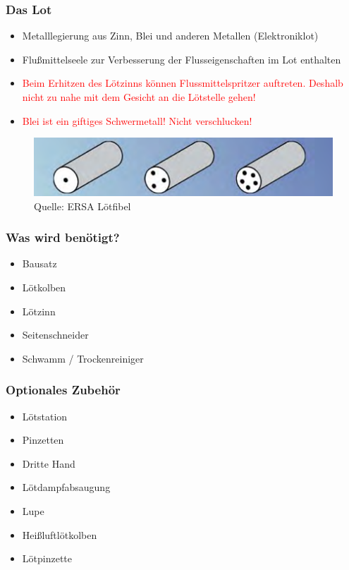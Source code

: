 \documentclass[10pt]{beamer}
\begin{document}
	\begin{frame}
	\frametitle{Das Lot}
	\begin{itemize}
		\item{Metalllegierung aus Zinn, Blei und anderen Metallen (Elektroniklot)}
		\item{Flußmittelseele zur Verbesserung der Flusseigenschaften im Lot enthalten}
		\item{\textcolor{red}{Beim Erhitzen des Lötzinns können Flussmittelspritzer auftreten. Deshalb nicht zu nahe mit dem Gesicht an die Lötstelle gehen!}}
		\item{\textcolor{red}{Blei ist ein giftiges Schwermetall! Nicht verschlucken!}}
	\end{itemize}
	\begin{figure}[hbtp]
		\centering
		\includegraphics[width=\linewidth]{images/lotseele.png}
		\caption{Quelle: ERSA Lötfibel}
	\end{figure}
	\end{frame}

	\begin{frame}
	\frametitle{Was wird benötigt?}
	\begin{itemize}
		\item{Bausatz}
		\item{Lötkolben}
		\item{Lötzinn}
		\item{Seitenschneider}
		\item{Schwamm / Trockenreiniger}
	\end{itemize}
	\end{frame}

	\begin{frame}
	\frametitle{Optionales Zubehör}
	\begin{itemize}
		\item{Lötstation}
		\item{Pinzetten}
		\item{Dritte Hand}
		\item{Lötdampfabsaugung}
		\item{Lupe}		
		
		\item{Heißluftlötkolben}
		\item{Lötpinzette}
	\end{itemize}
	\end{frame}
\end{document}
